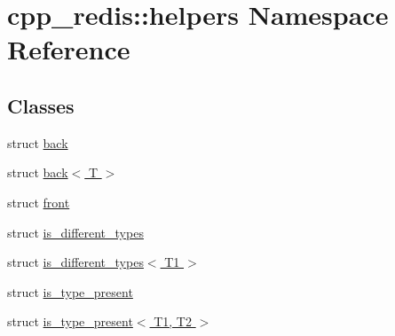\hypertarget{namespacecpp__redis_1_1helpers}{}\section{cpp\+\_\+redis\+:\+:helpers Namespace Reference}
\label{namespacecpp__redis_1_1helpers}
\subsection*{Classes}
\begin{DoxyCompactItemize}
\item 
struct \hyperlink{structcpp__redis_1_1helpers_1_1back}{back}
\item 
struct \hyperlink{structcpp__redis_1_1helpers_1_1back_3_01_t_01_4}{back$<$ T $>$}
\item 
struct \hyperlink{structcpp__redis_1_1helpers_1_1front}{front}
\item 
struct \hyperlink{structcpp__redis_1_1helpers_1_1is__different__types}{is\+\_\+different\+\_\+types}
\item 
struct \hyperlink{structcpp__redis_1_1helpers_1_1is__different__types_3_01_t1_01_4}{is\+\_\+different\+\_\+types$<$ T1 $>$}
\item 
struct \hyperlink{structcpp__redis_1_1helpers_1_1is__type__present}{is\+\_\+type\+\_\+present}
\item 
struct \hyperlink{structcpp__redis_1_1helpers_1_1is__type__present_3_01_t1_00_01_t2_01_4}{is\+\_\+type\+\_\+present$<$ T1, T2 $>$}
\end{DoxyCompactItemize}

